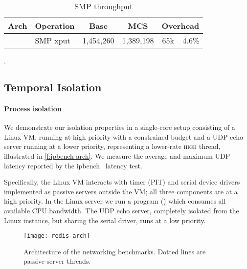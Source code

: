 \begin{table}[ht]\centering
\begin{tabular}{|c|l| r@{~}l | r@{~}l |r@{~}r|}\hline
\textbf{Arch}           & \multicolumn{1}{c|}{\textbf{Operation}}
                                & \multicolumn{2}{c|}{\textbf{Base}}
                                & \multicolumn{2}{c|}{\textbf{MCS}}
                                & \multicolumn{2}{c|}{\textbf{Overhead}} \\ \hline
%
%
& SMP xput & \multicolumn{2}{l|}{1,454,260} & \multicolumn{2}{l|}{1,389,198} & 65k & 4.6\% \\
\hline
\end{tabular}
\caption{SMP throughput}.
\label{t:micro-smp}
\end{table}

\subsection{Temporal Isolation}

\paragraph{Process isolation} We demonstrate our isolation properties
in a single-core setup consisting of a Linux VM,
running at high priority with a
constrained budget and a UDP echo server running at a lower priority,
representing a lower-rate \textsc{high} thread, illustrated in \autoref{f:ipbench-arch}. We
measure the average  and maximum UDP latency reported by the
ipbench~\citep{Wienand_Macpherson_04} latency test.

Specifically, the Linux VM interacts with timer (PIT) and serial device drivers implemented as
passive servers outside the VM; all three components are at a high priority. In the Linux server we
run a program () which consumes all available
CPU bandwidth.  The UDP echo server, completely isolated from the Linux instance, but sharing the serial driver,
runs at a low priority.

\begin{figure}[ht]
    \centering
    \texttt{[image: redis-arch]}
    \caption{Architecture of the networking benchmarks. Dotted lines
    \label{f:redis-arch}
    are passive-server threads.}
\end{figure}


